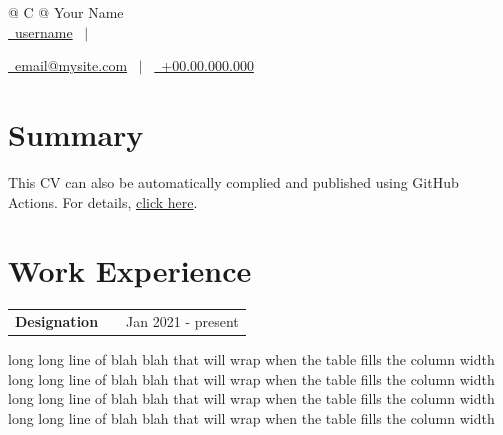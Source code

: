 \documentclass[a4paper,10pt]{article}
\makeatletter
\newenvironment{jobshort}[2]
    {
    \begin{tabularx}{\linewidth}{@{}l X r@{}}
    \textbf{#1} & \hfill &  #2 \\[3.75pt]
    \end{tabularx}
    }
    {
    }
\makeatother
\begin{document}
\pagestyle{empty} 



\begin{tabularx}{\linewidth}{@{} C @{}}
\Huge{Your Name} \\[7.5pt]

\href{https://linkedin.com/in/username}{\raisebox{-0.05\height}\faLinkedin\ username} \ $|$ \ 

\href{mailto:email@mysite.com}{\raisebox{-0.05\height}\faEnvelope \ email@mysite.com} \ $|$ \ 
\href{tel:+000000000000}{\raisebox{-0.05\height}\faMobile \ +00.00.000.000} \\
\end{tabularx}


\section{Summary}
This CV can also be automatically complied and published using GitHub Actions. For details, \href{https://github.com/jitinnair1/autoCV}{click here}.

\section{Work Experience}

\begin{jobshort}{Designation}{Jan 2021 - present}
long long line of blah blah that will wrap when the table fills the column width long long line of blah blah that will wrap when the table fills the column width long long line of blah blah that will wrap when the table fills the column width long long line of blah blah that will wrap when the table fills the column width
\end{jobshort}
\end{document}
